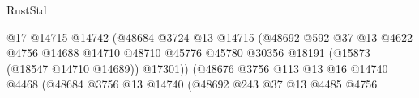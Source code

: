 \begin{lexlean}{RustStd}
\begin{coremodule}
                                                          @17
                                                          @14715
                                                          @14742
                                                          (@48684
                                                            @3724
                                                            @13
                                                            @14715
                                                            (@48692
                                                              @592
                                                              @37
                                                              @13
                                                              @4622
                                                              @4756
                                                              @14688
                                                              @14710
                                                              @48710
                                                              @45776
                                                              @45780
                                                              @30356
                                                              @18191
                                                              (@15873 (@18547 @14710 @14689))
                                                              @17301))
                                                          (@48676
                                                            @3756
                                                            @113
                                                            @13
                                                            @16
                                                            @14740
                                                            @4468
                                                            (@48684
                                                              @3756
                                                              @13
                                                              @14740
                                                              (@48692
                                                                @243
                                                                @37
                                                                @13
                                                                @4485
                                                                @4756

\end{coremodule}
\end{lexlean}
